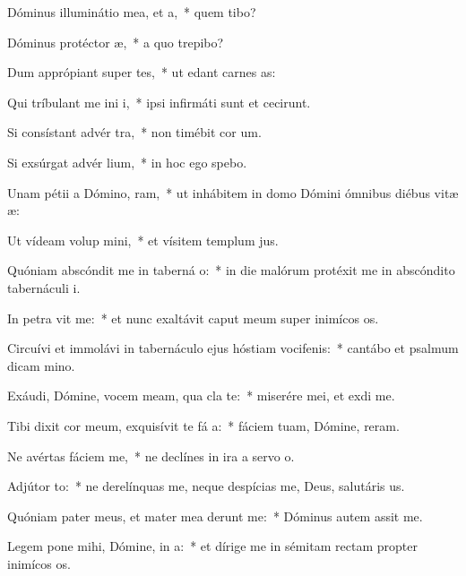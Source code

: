 \item Dóminus illuminátio mea, et  a,~* quem tibo?
\item Dóminus protéctor  æ,~* a quo trepibo?
\item Dum apprópiant super  tes,~* ut edant carnes as:
\item Qui tríbulant me ini i,~* ipsi infirmáti sunt et cecirunt.
\item Si consístant advér  tra,~* non timébit cor um.
\item Si exsúrgat advér  lium,~* in hoc ego spebo.
\item Unam pétii a Dómino,  ram,~* ut inhábitem in domo Dómini ómnibus diébus vitæ æ:
\item Ut vídeam volup mini,~* et vísitem templum jus.
\item Quóniam abscóndit me in taberná o:~* in die malórum protéxit me in abscóndito tabernáculi i.
\item In petra vit me:~* et nunc exaltávit caput meum super inimícos os.
\item Circuívi et immolávi in tabernáculo ejus hóstiam vocifenis:~* cantábo et psalmum dicam mino.
\item Exáudi, Dómine, vocem meam, qua cla  te:~* miserére mei, et exdi me.
\item Tibi dixit cor meum, exquisívit te fá a:~* fáciem tuam, Dómine, reram.
\item Ne avértas fáciem   me,~* ne declínes in ira a servo o.
\item Adjútor  to:~* ne derelínquas me, neque despícias me, Deus, salutáris us.
\item Quóniam pater meus, et mater mea derunt me:~* Dóminus autem assit me.
\item Legem pone mihi, Dómine, in  a:~* et dírige me in sémitam rectam propter inimícos os.

